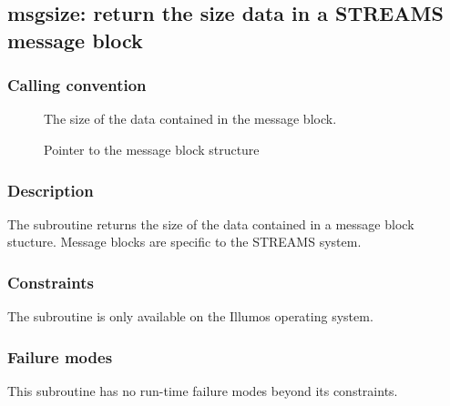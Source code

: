 \clearpage
{}
{}
\label{subr:msgsize}
\subsection*{msgsize: return the size data in a  STREAMS message block}

\subsubsection*{Calling convention}

\begin{description}
\item[] The size of the data contained in the
  message block.
\item[] Pointer to the message block structure
\end{description}

\subsubsection*{Description}

The  subroutine returns the size of the data
contained in a message block stucture.  Message blocks are specific to
the STREAMS system.

\subsubsection*{Constraints}

The  subroutine is only available on the Illumos
operating system.

\subsubsection*{Failure modes}

This subroutine has no run-time failure modes beyond its constraints.
